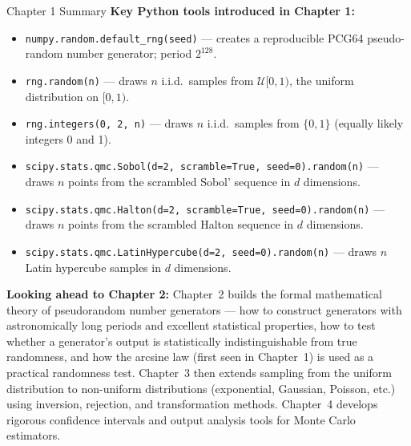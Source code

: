 \documentclass[aspectratio=169,10pt]{beamer}
\begin{document}
\begin{frame}[allowframebreaks]{Chapter 1 Summary}
  \textbf{Key Python tools introduced in Chapter 1:}
  \begin{itemize}
    \item \texttt{numpy.random.default\_rng(seed)} --- creates a reproducible
      PCG64 pseudo-random number generator; period $2^{128}$.
    \item \texttt{rng.random(n)} --- draws $n$ i.i.d.\ samples from
      $\mathcal{U}[0,1)$, the uniform distribution on $[0,1)$.
    \item \texttt{rng.integers(0, 2, n)} --- draws $n$ i.i.d.\ samples from
      $\{0, 1\}$ (equally likely integers 0 and 1).
    \item \texttt{scipy.stats.qmc.Sobol(d=2, scramble=True, seed=0).random(n)}
      --- draws $n$ points from the scrambled Sobol' sequence in $d$ dimensions.
    \item \texttt{scipy.stats.qmc.Halton(d=2, scramble=True, seed=0).random(n)}
      --- draws $n$ points from the scrambled Halton sequence in $d$ dimensions.
    \item \texttt{scipy.stats.qmc.LatinHypercube(d=2, seed=0).random(n)}
      --- draws $n$ Latin hypercube samples in $d$ dimensions.
  \end{itemize}

  \bigskip
  \textbf{Looking ahead to Chapter 2:}  Chapter~2 builds the formal
  mathematical theory of pseudorandom number generators --- how to construct
  generators with astronomically long periods and excellent statistical
  properties, how to test whether a generator's output is statistically
  indistinguishable from true randomness, and how the arcsine law (first seen
  in Chapter~1) is used as a practical randomness test.  Chapter~3 then extends
  sampling from the uniform distribution to non-uniform distributions
  (exponential, Gaussian, Poisson, etc.) using inversion, rejection, and
  transformation methods.  Chapter~4 develops rigorous confidence intervals and
  output analysis tools for Monte Carlo estimators.

\end{frame}
\end{document}
